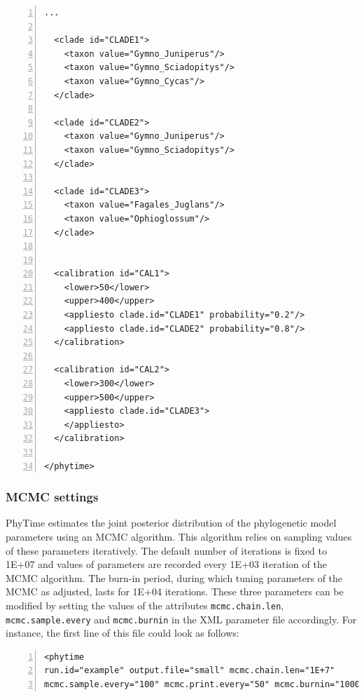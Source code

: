 \documentclass[a4paper,12pt]{article}
\newcommand{\x}[1]{\texttt{#1}}
\begin{document}
\begin{Verbatim}[frame=single, label=Example of PhyTime XML file with calibration uncertainty, samepage=true, baselinestretch=0.5,
  fontsize=\small, numbers=left]
  ...
 
  <clade id="CLADE1">
    <taxon value="Gymno_Juniperus"/>
    <taxon value="Gymno_Sciadopitys"/>
    <taxon value="Gymno_Cycas"/>
  </clade>

  <clade id="CLADE2">
    <taxon value="Gymno_Juniperus"/>
    <taxon value="Gymno_Sciadopitys"/>
  </clade>

  <clade id="CLADE3">
    <taxon value="Fagales_Juglans"/>
    <taxon value="Ophioglossum"/>
  </clade>

  
  <calibration id="CAL1">
    <lower>50</lower>
    <upper>400</upper>
    <appliesto clade.id="CLADE1" probability="0.2"/>
    <appliesto clade.id="CLADE2" probability="0.8"/>
  </calibration>

  <calibration id="CAL2">
    <lower>300</lower>
    <upper>500</upper>
    <appliesto clade.id="CLADE3">
    </appliesto>
  </calibration>

</phytime>
\end{Verbatim}


\subsubsection{MCMC settings}

PhyTime estimates the joint posterior distribution  of the phylogenetic model parameters  using an
MCMC algorithm. This algorithm relies on sampling values of these parameters iteratively. The
default number of iterations is fixed to 1E+07 and values of parameters are recorded every 1E+03
iteration of the MCMC algorithm. The burn-in period, during which tuning parameters of the MCMC as
adjusted, lasts for 1E+04 iterations. These three parameters can be modified by setting the values
of the attributes \x{mcmc.chain.len}, \x{mcmc.sample.every} and \x{mcmc.burnin} in the XML parameter
file accordingly. For instance, the first line of this file could look as follows: 
\vspace{0.2cm}
\begin{Verbatim}[frame=single, label=MCMC settings, samepage=true, baselinestretch=0.5,
  fontsize=\small, numbers=left]
<phytime
run.id="example" output.file="small" mcmc.chain.len="1E+7" 
mcmc.sample.every="100" mcmc.print.every="50" mcmc.burnin="10000">
\end{Verbatim}
\end{document}
